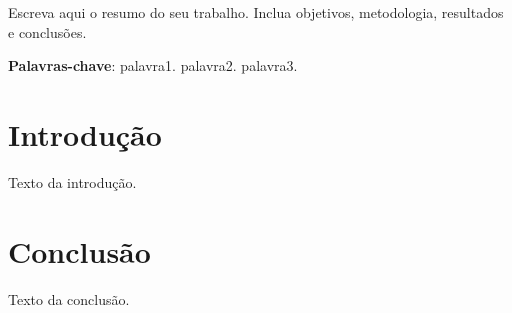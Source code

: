 \documentclass[

12pt, %

openright, %

oneside, %

a4paper, %

brazil %

]{abntex2}
\begin{document}
\imprimircapa
\imprimirfolhaderosto*

\begin{resumo}
Escreva aqui o resumo do seu trabalho.  
Inclua objetivos, metodologia, resultados e conclusões.

\vspace{\onelineskip}
\noindent
\textbf{Palavras-chave}: palavra1. palavra2. palavra3.
\end{resumo}

\tableofcontents

\newpage
\listoftables

\newpage
\listoffigures




\chapter{Introdução}
Texto da introdução.






\chapter{Conclusão}

Texto da conclusão.



\end{document}
